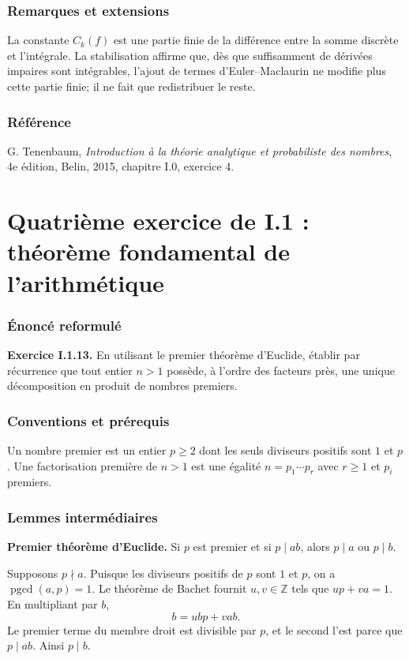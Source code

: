 \documentclass[11pt,a4paper]{article}
\newcommand{\Z}{\mathbb{Z}}
\DeclareMathOperator{\pgcd}{pgcd}
\begin{document}
\section{Remarques et extensions}
\begin{remarkbox}
La constante $C_k(f)$ est une partie finie de la diff\'erence entre la somme
discr\`ete et l'int\'egrale. La stabilisation affirme que, d\`es que suffisamment
de d\'eriv\'ees impaires sont int\'egrables, l'ajout de termes d'Euler--Maclaurin
ne modifie plus cette partie finie; il ne fait que redistribuer le reste.
\end{remarkbox}

\section{R\'ef\'erence}
G. Tenenbaum, \emph{Introduction \`a la th\'eorie analytique et probabiliste
des nombres}, 4e \'edition, Belin, 2015, chapitre I.0, exercice 4.

\part{Quatri\`eme exercice de I.1 : th\'eor\`eme fondamental de l'arithm\'etique}

\section{\'Enonc\'e reformul\'e}
\begin{theorembox}
\textbf{Exercice I.1.13.}
En utilisant le premier th\'eor\`eme d'Euclide, \'etablir par r\'ecurrence que
tout entier $n>1$ poss\`ede, \`a l'ordre des facteurs pr\`es, une unique
d\'ecomposition en produit de nombres premiers.
\end{theorembox}

\section{Conventions et pr\'erequis}
Un nombre premier est un entier $p\geq2$ dont les seuls diviseurs positifs sont
$1$ et $p$. Une factorisation premi\`ere de $n>1$ est une \'egalit\'e
$n=p_1\cdots p_r$ avec $r\geq1$ et $p_i$ premiers.

\section{Lemmes interm\'ediaires}
\begin{lemmabox}
\textbf{Premier th\'eor\`eme d'Euclide.}
Si $p$ est premier et si $p\mid ab$, alors $p\mid a$ ou $p\mid b$.
\end{lemmabox}
\begin{proofbox}
Supposons $p\nmid a$. Puisque les diviseurs positifs de $p$ sont $1$ et $p$,
on a $\pgcd(a,p)=1$. Le th\'eor\`eme de Bachet fournit $u,v\in\Z$ tels que
$up+va=1$. En multipliant par $b$,
\[
 b=ubp+vab.
\]
Le premier terme du membre droit est divisible par $p$, et le second l'est parce
que $p\mid ab$. Ainsi $p\mid b$.
\end{proofbox}
\end{document}
